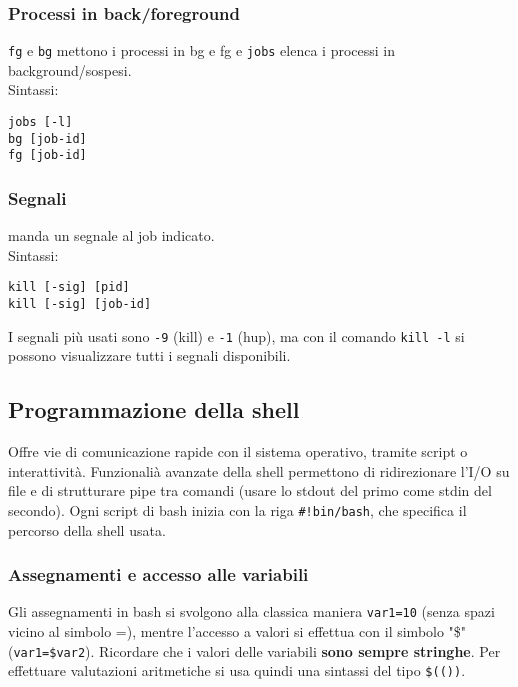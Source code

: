 \documentclass[a4paper]{article}
\begin{document}
\subsubsection{Processi in back/foreground} \verb|fg| e \verb|bg| mettono i processi in bg e fg e \verb|jobs| elenca i processi in background/sospesi.\\
Sintassi:
\begin{verbatim}
jobs [-l]
bg [job-id]
fg [job-id]
\end{verbatim}

\subsubsection{Segnali} manda un segnale al job indicato. \\
Sintassi:
\begin{verbatim}
kill [-sig] [pid]
kill [-sig] [job-id]
\end{verbatim}
I segnali più usati sono \verb|-9| (kill) e \verb|-1| (hup), ma con il comando \verb|kill -l| si possono visualizzare tutti i segnali disponibili.

\subsection{Programmazione della shell}
Offre vie di comunicazione rapide con il sistema operativo, tramite script o interattività. Funzionalià avanzate della shell permettono di ridirezionare l'I/O su file e di strutturare pipe tra comandi (usare lo stdout del primo come stdin del secondo).
Ogni script di bash inizia con la riga \verb|#!bin/bash|, che specifica il percorso della shell usata.

\subsubsection{Assegnamenti e accesso alle variabili}
Gli assegnamenti in bash si svolgono alla classica maniera \verb|var1=10| (senza spazi vicino al simbolo =), mentre l'accesso a valori si effettua con il simbolo "\$" (\verb|var1=$var2|). Ricordare che i valori delle variabili \textbf{sono sempre stringhe}. Per effettuare valutazioni aritmetiche si usa quindi una sintassi del tipo \verb|$(())|.
\end{document}
